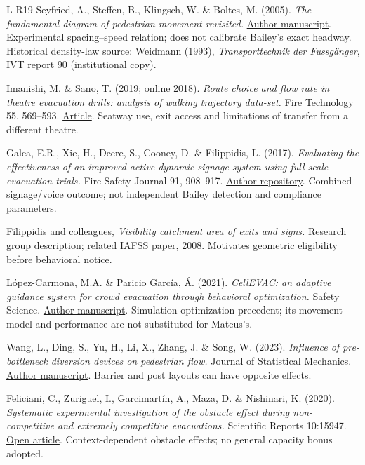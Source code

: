 \documentclass[11pt,a4paper]{article}
\begin{document}
\begin{thebibliography}{L-R19}
 Seyfried, A., Steffen, B., Klingsch, W. \& Boltes, M. (2005). \emph{The fundamental diagram of pedestrian movement revisited.} \href{https://arxiv.org/abs/physics/0506170}{Author manuscript}. Experimental spacing–speed relation; does not calibrate Bailey's exact headway. Historical density-law source: Weidmann (1993), \emph{Transporttechnik der Fussgänger}, IVT report 90 (\href{https://asim.uni-wuppertal.de/fileadmin/bauing/asim/Datenbank/Data_from_literature/Fundamental_Diagrams/weidmann-1993_01.pdf}{institutional copy}).

 Imanishi, M. \& Sano, T. (2019; online 2018). \emph{Route choice and flow rate in theatre evacuation drills: analysis of walking trajectory data-set.} Fire Technology 55, 569–593. \href{https://doi.org/10.1007/s10694-018-0783-2}{Article}. Seatway use, exit access and limitations of transfer from a different theatre.

 Galea, E.R., Xie, H., Deere, S., Cooney, D. \& Filippidis, L. (2017). \emph{Evaluating the effectiveness of an improved active dynamic signage system using full scale evacuation trials.} Fire Safety Journal 91, 908–917. \href{https://gala.gre.ac.uk/id/eprint/16552/}{Author repository}. Combined-signage/voice outcome; not independent Bailey detection and compliance parameters.

 Filippidis and colleagues, \emph{Visibility catchment area of exits and signs.} \href{https://fseg.gre.ac.uk/fire/visibility_catchment_area.html}{Research group description}; related \href{https://publications.iafss.org/publications/fss/9/389/view}{IAFSS paper, 2008}. Motivates geometric eligibility before behavioral notice.

 López-Carmona, M.A. \& Paricio García, Á. (2021). \emph{CellEVAC: an adaptive guidance system for crowd evacuation through behavioral optimization.} Safety Science. \href{https://arxiv.org/abs/2007.05963}{Author manuscript}. Simulation-optimization precedent; its movement model and performance are not substituted for Mateus's.

 Wang, L., Ding, S., Yu, H., Li, X., Zhang, J. \& Song, W. (2023). \emph{Influence of pre-bottleneck diversion devices on pedestrian flow.} Journal of Statistical Mechanics. \href{https://arxiv.org/abs/2212.01296}{Author manuscript}. Barrier and post layouts can have opposite effects.

 Feliciani, C., Zuriguel, I., Garcimartín, A., Maza, D. \& Nishinari, K. (2020). \emph{Systematic experimental investigation of the obstacle effect during non-competitive and extremely competitive evacuations.} Scientific Reports 10:15947. \href{https://pmc.ncbi.nlm.nih.gov/articles/PMC7525554/}{Open article}. Context-dependent obstacle effects; no general capacity bonus adopted.


\end{thebibliography}
\end{document}
